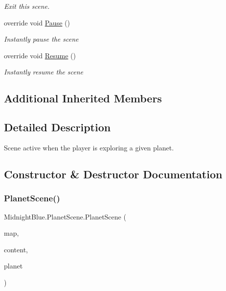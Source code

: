 \begin{DoxyCompactItemize}
\begin{DoxyCompactList}\small\item\em Exit this scene. \end{DoxyCompactList}\item 
override void \hyperlink{class_midnight_blue_1_1_planet_scene_abc077e1cd5f40879ca3af4224f0ff455}{Pause} ()
\begin{DoxyCompactList}\small\item\em Instantly pause the scene \end{DoxyCompactList}\item 
override void \hyperlink{class_midnight_blue_1_1_planet_scene_aa14750d3675b59462796e821b3921397}{Resume} ()
\begin{DoxyCompactList}\small\item\em Instantly resume the scene \end{DoxyCompactList}\end{DoxyCompactItemize}
\subsection*{Additional Inherited Members}


\subsection{Detailed Description}
Scene active when the player is exploring a given planet. 



\subsection{Constructor \& Destructor Documentation}
\hypertarget{class_midnight_blue_1_1_planet_scene_a50ee691836116a89ff549e519f895ba3}{}\label{class_midnight_blue_1_1_planet_scene_a50ee691836116a89ff549e519f895ba3} 
\subsubsection{\texorpdfstring{Planet\+Scene()}{PlanetScene()}}
{\footnotesize\ttfamily Midnight\+Blue.\+Planet\+Scene.\+Planet\+Scene (\begin{DoxyParamCaption}\item[{\hyperlink{class_midnight_blue_1_1_engine_1_1_entity_component_1_1_entity_map}{Entity\+Map}}]{map,  }\item[{Content\+Manager}]{content,  }\item[{\hyperlink{class_midnight_blue_1_1_planet}{Planet}}]{planet }\end{DoxyParamCaption})\hspace{0.3cm}{\ttfamily [inline]}}



